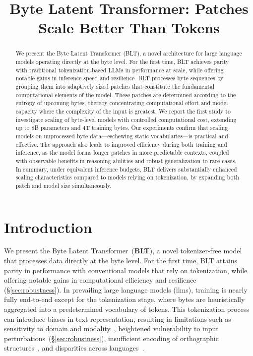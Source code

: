 \title{Byte Latent Transformer: Patches Scale Better Than Tokens}

\begin{abstract}
We present the Byte Latent Transformer (\textsc{BLT}), a novel architecture for large language models operating directly at the byte level. For the first time, \textsc{BLT} achieves parity with traditional tokenization-based LLMs in performance at scale, while offering notable gains in inference speed and resilience. \textsc{BLT} processes byte sequences by grouping them into adaptively sized patches that constitute the fundamental computational elements of the model. These patches are determined according to the entropy of upcoming bytes, thereby concentrating computational effort and model capacity where the complexity of the input is greatest. We report the first study to investigate scaling of byte-level models with controlled computational cost, extending up to 8B parameters and 4T training bytes. Our experiments confirm that scaling models on unprocessed byte data—eschewing static vocabularies—is practical and effective. The approach also leads to improved efficiency during both training and inference, as the model forms longer patches in more predictable contexts, coupled with observable benefits in reasoning abilities and robust generalization to rare cases. In summary, under equivalent inference budgets, \textsc{BLT} delivers substantially enhanced scaling characteristics compared to models relying on tokenization, by expanding both patch and model size simultaneously.
\end{abstract}

\section{Introduction}
\label{section:intro}

We present the Byte Latent Transformer~(\textbf{BLT}), a novel tokenizer-free model that processes data directly at the byte level. For the first time, BLT attains parity in performance with conventional models that rely on tokenization, while offering notable gains in computational efficiency and resilience (\S\ref{sec:robustness}). In prevailing large language models (llms), training is nearly fully end-to-end except for the tokenization stage, where bytes are heuristically aggregated into a predetermined vocabulary of tokens. This tokenization process can introduce biases in text representation, resulting in limitations such as sensitivity to domain and modality~\citep{dagangetting}, heightened vulnerability to input perturbations~(\S\ref{sec:robustness}), insufficient encoding of orthographic structures~\citep{edman2024cute}, and disparities across languages~\citep{liang2023xlm,petrov2024language,limisiewicz2024myte}.

